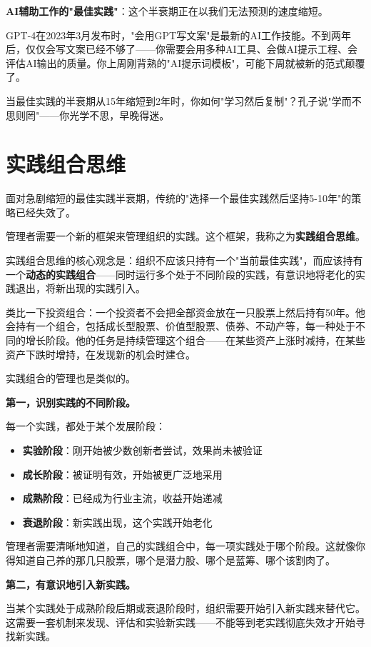 \textbf{AI辅助工作的"最佳实践"}：这个半衰期正在以我们无法预测的速度缩短。

GPT-4在2023年3月发布时，"会用GPT写文案"是最新的AI工作技能。不到两年后，仅仅会写文案已经不够了——你需要会用多种AI工具、会做AI提示工程、会评估AI输出的质量。你上周刚背熟的"AI提示词模板"，可能下周就被新的范式颠覆了。

当最佳实践的半衰期从15年缩短到2年时，你如何"学习然后复制"？孔子说"学而不思则罔"——你光学不思，早晚得迷。

\section{实践组合思维}


面对急剧缩短的最佳实践半衰期，传统的"选择一个最佳实践然后坚持5-10年"的策略已经失效了。

管理者需要一个新的框架来管理组织的实践。这个框架，我称之为\textbf{实践组合思维}。

实践组合思维的核心观念是：组织不应该只持有一个"当前最佳实践"，而应该持有一个\textbf{动态的实践组合}——同时运行多个处于不同阶段的实践，有意识地将老化的实践退出，将新出现的实践引入。

类比一下投资组合：一个投资者不会把全部资金放在一只股票上然后持有50年。他会持有一个组合，包括成长型股票、价值型股票、债券、不动产等，每一种处于不同的增长阶段。他的任务是持续管理这个组合——在某些资产上涨时减持，在某些资产下跌时增持，在发现新的机会时建仓。

实践组合的管理也是类似的。

\textbf{第一，识别实践的不同阶段。}

每一个实践，都处于某个发展阶段：

\begin{itemize}
\item \textbf{实验阶段}：刚开始被少数创新者尝试，效果尚未被验证
\item \textbf{成长阶段}：被证明有效，开始被更广泛地采用
\item \textbf{成熟阶段}：已经成为行业主流，收益开始递减
\item \textbf{衰退阶段}：新实践出现，这个实践开始老化

\end{itemize}
管理者需要清晰地知道，自己的实践组合中，每一项实践处于哪个阶段。这就像你得知道自己养的那几只股票，哪个是潜力股、哪个是蓝筹、哪个该割肉了。

\textbf{第二，有意识地引入新实践。}

当某个实践处于成熟阶段后期或衰退阶段时，组织需要开始引入新实践来替代它。这需要一套机制来发现、评估和实验新实践——不能等到老实践彻底失效才开始寻找新实践。

